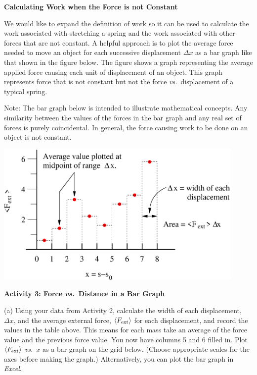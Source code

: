 \bigskip
\textbf{Calculating Work when the Force is not Constant }

We would like to expand the definition of work so it can be used to calculate
the work associated with stretching a spring and the work associated with other
forces that are not constant. A helpful approach is to plot the average force
needed to move an object for each successive displacement \( \Delta  x\) as
a bar graph like that shown in the figure below. The figure shows a graph representing
the average applied force causing each unit of displacement of an object. This
graph represents force that is not constant but not the force \textit{vs.}~displacement
of a typical spring.

Note: The bar graph below is intended to illustrate mathematical concepts. Any
similarity between the values of the forces in the bar graph and any real set
of forces is purely coincidental. In general, the force causing work to be done
on an object is not constant.

\vspace{0.3cm}
{\par\centering \includegraphics[height=2.75in]{work_kinetic/workAndKEF1.eps} \par}
\vspace{0.3cm}

\textbf{Activity 3: Force \textit{vs.}~Distance in a Bar Graph }

(a) Using your data from Activity 2, calculate the width of each displacement, \( \Delta x \), and the average external force, \(\langle F_{\rm ext} \rangle\) for each displacement, and record the values in the table above. This means for each mass take an average of the force value and the previous force value. You now have columns 5 and 6 filled in. Plot \( \langle F_{\rm ext} \rangle\) \textit{vs.}~$x$ as a bar graph on the grid below.  (Choose appropriate scales for the axes before making the graph.) Alternatively, you can plot the bar graph in \textit{Excel}.

